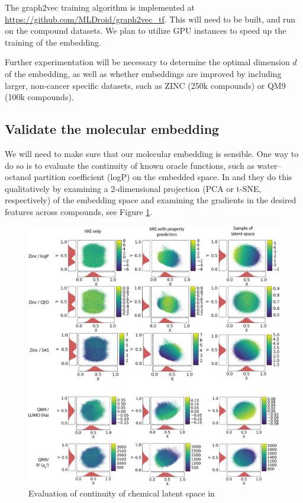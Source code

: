 \documentclass{article}
\begin{document}
The graph2vec training algorithm is implemented at \url{https://github.com/MLDroid/graph2vec_tf}. This will need to be built, and run on the compound datasets. We plan to utilize GPU instances to speed up the training of the embedding.

Further experimentation will be necessary to determine the optimal dimension $d$ of the embedding, as well as whether embeddings are improved by including larger, non-cancer specific datasets, such as ZINC (250k compounds) or QM9 (100k compounds).

\subsection{Validate the molecular embedding}

We will need to make sure that our molecular embedding is sensible. One way to do so is to evaluate the continuity of known oracle functions, such as water–octanol partition coefficient (logP) on the embedded space. In \cite{Gomez-Bombarelli2018} and \cite{Asgari2015} they do this qualitatively by examining a 2-dimensional projection (PCA or t-SNE, respectively) of the embedding space and examining the gradients in the desired features across compounds, see Figure \ref{chemvae_continuity}.

\begin{figure}[h]
\includegraphics[width=\textwidth]{figs/chemvae_continuity.jpeg}
\caption{Evaluation of continuity of chemical latent space in \cite{Gomez-Bombarelli2018}}
\label{chemvae_continuity}
\end{figure}
\end{document}
